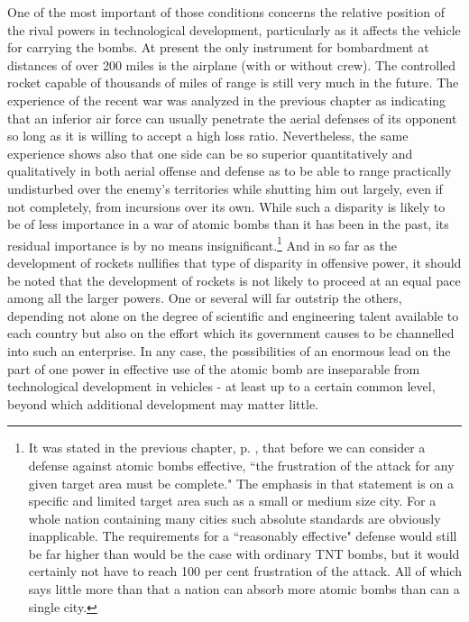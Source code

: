 One of the most important of those conditions concerns the relative position of the rival powers in technological development, particularly as it affects the vehicle for carrying the bombs. At present the only instrument for bombardment at distances of over 200 miles is the airplane (with or without crew). The controlled rocket capable of thousands of miles of range is still very much in the future. The experience of the recent war was analyzed in the previous chapter as indicating that an inferior air force can usually penetrate the aerial defenses of its opponent so long as it is willing to accept a high loss ratio. \label{II-Superior} Nevertheless, the same experience shows also that one side can be so superior quantitatively and qualitatively in both aerial offense and defense as to be able to range practically undisturbed over the enemy's territories while shutting him out largely, even if not completely, from incursions over its own. While such a disparity is likely to be of less importance in a war of atomic bombs than it has been in the past, its residual importance is by no means insignificant.\footnote{It was stated in the previous chapter, p. \pageref{I-frustrate}, that before we can consider a defense against atomic bombs effective, ``the frustration of the attack for any given target area must be complete." The emphasis in that statement is on a specific and limited target area such as a small or medium size city. For a whole nation containing many cities such absolute standards are obviously inapplicable. The requirements for a ``reasonably effective" defense would still be far higher than would be the case with ordinary TNT bombs, but it would certainly not have to reach 100 per cent frustration of the attack. All of which says little more than that a nation can absorb more atomic bombs than can a single city.} And in so far as the development of rockets nullifies that type of disparity in offensive power, it should be noted that the development of rockets is not likely to proceed at an equal pace among all the larger powers. One or several will far outstrip the others, depending not alone on the degree of scientific and engineering talent available to each country but also on the effort which its government causes to be channelled into such an enterprise. In any case, the possibilities of an enormous lead on the part of one power in effective use of the atomic bomb are inseparable from technological development in vehicles - at least up to a certain common level, beyond which additional development may matter little.

